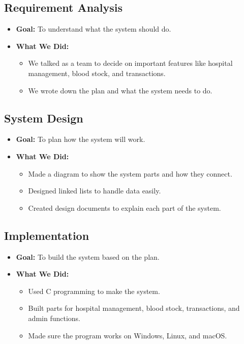 \documentclass[12pt,a4paper]{report}
\begin{document}
\subsection{Requirement Analysis}
\begin{itemize}
    \item \normalsize \textbf{Goal:} To understand what the system should do.
    \item \normalsize \textbf{What We Did:}
    \begin{itemize}
        \item We talked as a team to decide on important features like hospital management, blood stock, and transactions.
        \item We wrote down the plan and what the system needs to do.
    \end{itemize}
\end{itemize}

\subsection{System Design}
\begin{itemize}
    \item \normalsize \textbf{Goal:} To plan how the system will work.
    \item \normalsize \textbf{What We Did:}
    \begin{itemize}
        \item Made a diagram to show the system parts and how they connect.
        \item Designed linked lists to handle data easily.
        \item Created design documents to explain each part of the system.
    \end{itemize}
\end{itemize}

\subsection{Implementation}
\begin{itemize}
    \item \normalsize \textbf{Goal:} To build the system based on the plan.
    \item \normalsize \textbf{What We Did:}
    \begin{itemize}
        \item Used C programming to make the system.
        \item Built parts for hospital management, blood stock, transactions, and admin functions.
        \item Made sure the program works on Windows, Linux, and macOS.\
    \end{itemize}
\end{itemize}
\end{document}
